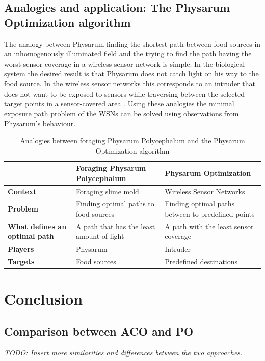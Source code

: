 \documentclass[cameraready]{IWORK2014}
\begin{document}
\subsection{Analogies and application: The Physarum Optimization algorithm}
The analogy between Physarum finding the shortest path between food sources in an inhomogenously illuminated field and the trying to find the path having the worst sensor coverage in a wireless sensor network is simple. In the biological system the desired result is that Physarum does not catch light on his way to the food source. In the wireless sensor networks this corresponds to an intruder that does not want to be exposed to sensors while traversing between the selected target points in a sensor-covered area \cite{liu2012physarum}. Using these analogies the minimal exposure path problem of the WSNs can be solved using observations from Physarum's behaviour.

\begin{table}
	\begin{tabularx}{0.90\textwidth}{|X|X|X|}
		\hline & \textbf{Foraging Physarum Polycephalum} & \textbf{Physarum Optimization} \\ \hline
		\textbf{Context} & Foraging slime mold & Wireless Sensor Networks \\ \hline
		\textbf{Problem} & Finding optimal paths to food sources & Finding optimal paths between to predefined points \\ \hline
		\textbf{What defines an optimal path} & A path that has the least amount of light & A path with the least sensor coverage \\ \hline
		\textbf{Players} & Physarum & Intruder \\ \hline
		\textbf{Targets} & Food sources & Predefined destinations \\ \hline
	\end{tabularx}
	\caption{Analogies between foraging Physarum Polycephalum and the Physarum Optimization algorithm}
	\label{tbl:analogies_physarum}
\end{table}

\section{Conclusion}

\subsection{Comparison between ACO and PO}
\textit{TODO: Insert more similarities and differences between the two approaches.}
\end{document}
